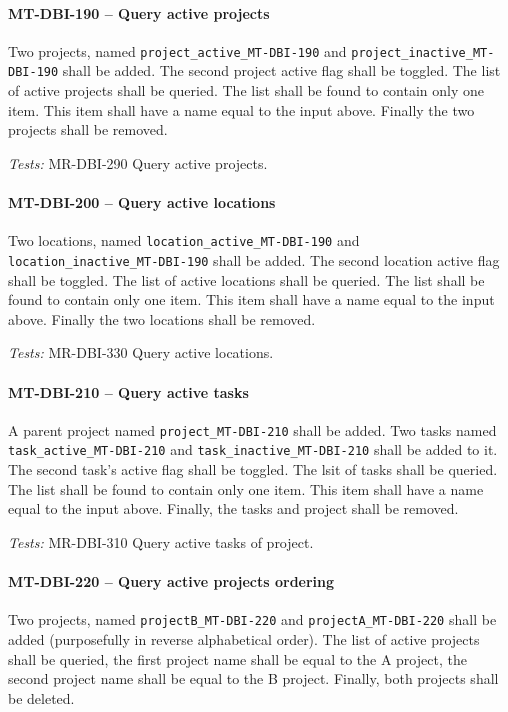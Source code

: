 \paragraph{MT-DBI-190 -- Query active projects}
Two projects, named \lstinline{project_active_MT-DBI-190}
and \lstinline{project_inactive_MT-DBI-190} shall be added.
The second project active flag shall be toggled.
The list of active projects shall be queried.
The list shall be found to contain only one item.
This item shall have a name equal to the input above.
Finally the two projects shall be removed.

\textit{Tests: } MR-DBI-290 Query active projects.

\paragraph{MT-DBI-200 -- Query active locations}
Two locations, named \lstinline{location_active_MT-DBI-190}
and \lstinline{location_inactive_MT-DBI-190} shall be added.
The second location active flag shall be toggled.
The list of active locations shall be queried.
The list shall be found to contain only one item.
This item shall have a name equal to the input above.
Finally the two locations shall be removed.

\textit{Tests: } MR-DBI-330 Query active locations.

\paragraph{MT-DBI-210 -- Query active tasks}
A parent project named \lstinline{project_MT-DBI-210}
shall be added.
Two tasks named \lstinline{task_active_MT-DBI-210}
and \lstinline{task_inactive_MT-DBI-210} shall be added
to it.
The second task's active flag shall be toggled.
The lsit of tasks shall be queried. The list shall be found to
contain only one item. This item shall have a name equal
to the input above.
Finally, the tasks and project shall be removed.

\textit{Tests: } MR-DBI-310 Query active tasks of project.

\paragraph{MT-DBI-220 -- Query active projects ordering}
Two projects, named \lstinline{projectB_MT-DBI-220}
and \lstinline{projectA_MT-DBI-220} shall be added
(purposefully in reverse alphabetical order).
The list of active projects shall be queried, the first
project name shall be equal to the A project,
the second project name shall be equal to the B project.
Finally, both projects shall be deleted.

